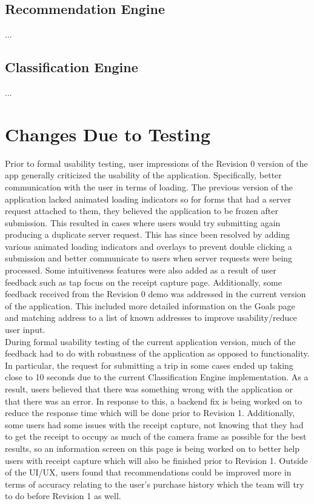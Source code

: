 \documentclass[12pt, titlepage]{article}
\begin{document}
\subsection{Recommendation Engine}

...

\subsection{Classification Engine}

...

\section{Changes Due to Testing}


Prior to formal usability testing, user impressions of the Revision 0 version of the app
generally criticized the usability of the application. Specifically, better communication with
the user in terms of loading. The previous version of the application lacked animated loading
indicators so for forms that had a server request attached to them, they believed the application
to be frozen after submission. This resulted in cases where users would try submitting again producing
a duplicate server request. This has since been resolved by adding various animated loading indicators
and overlays to prevent double clicking a submission and better communicate to users when server requests
were being processed. Some intuitiveness features were also added as a result of user feedback such as
tap focus on the receipt capture page. Additionally, some feedback received from the Revision 0 demo
was addressed in the current version of the application. This included more detailed information
on the Goals page and matching address to a list of known addresses to improve usability/reduce user
input.\\

During formal usability testing of the current application version, much of the feedback had to do with robustness
of the application as opposed to functionality. In particular, the request for submitting a trip
in some cases ended up taking close to 10 seconds due to the current Classification Engine implementation. As
a result, users believed that there was something wrong with the application or that there was an error. In response to this,
a backend fix is being worked on to reduce the response time which will be done prior to Revision 1.
Additionally, some users had some issues with the receipt capture, not knowing that they had to get the
receipt to occupy as much of the camera frame as possible for the best results, so an information screen
on this page is being worked on to better help users with receipt capture which will also be finished
prior to Revision 1. Outside of the UI/UX, users found that recommendations could be improved more
in terms of accuracy relating to the user's purchase history which the team will try to do before Revision 1
as well.
\end{document}
